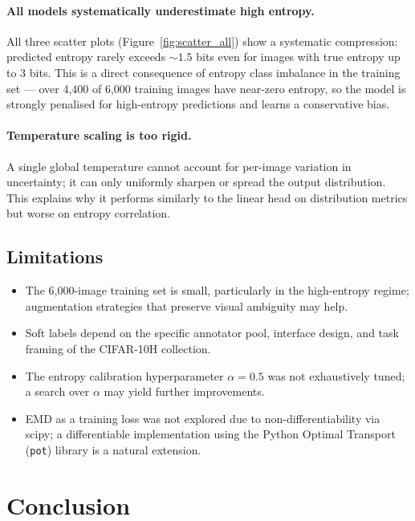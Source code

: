 \documentclass[11pt,a4paper]{article}
\begin{document}
\paragraph{All models systematically underestimate high entropy.}
All three scatter plots (Figure~\ref{fig:scatter_all}) show a systematic
compression: predicted entropy rarely exceeds ${\sim}1.5$ bits even for images
with true entropy up to $3$ bits.
This is a direct consequence of entropy class imbalance in the training set —
over 4,400 of 6,000 training images have near-zero entropy, so the model is
strongly penalised for high-entropy predictions and learns a conservative bias.

\paragraph{Temperature scaling is too rigid.}
A single global temperature cannot account for per-image variation in
uncertainty; it can only uniformly sharpen or spread the output distribution.
This explains why it performs similarly to the linear head on distribution
metrics but worse on entropy correlation.

\subsection{Limitations}

\begin{itemize}[noitemsep]
  \item The 6,000-image training set is small, particularly in the high-entropy
        regime; augmentation strategies that preserve visual ambiguity may help.
  \item Soft labels depend on the specific annotator pool, interface design,
        and task framing of the CIFAR-10H collection.
  \item The entropy calibration hyperparameter $\alpha = 0.5$ was not
        exhaustively tuned; a search over $\alpha$ may yield further
        improvements.
  \item EMD as a training loss was not explored due to non-differentiability
        via scipy; a differentiable implementation using the Python Optimal
        Transport (\texttt{pot}) library is a natural extension.
\end{itemize}

\section{Conclusion}
\end{document}
